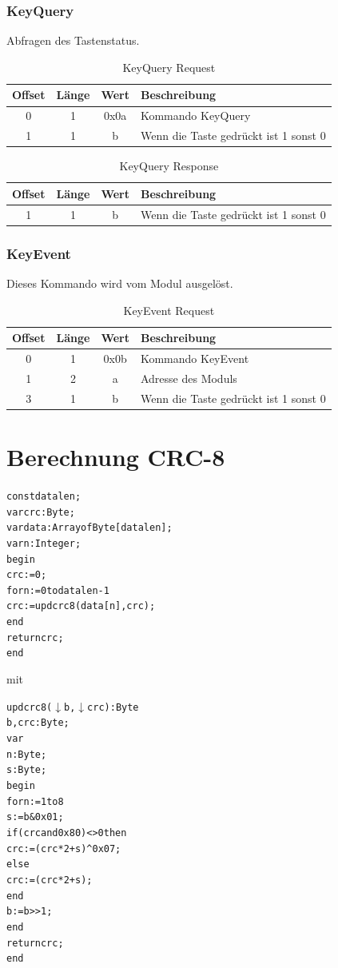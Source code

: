 \documentclass[10pt,a4paper]{article}
\begin{document}
\subsubsection{KeyQuery}
\label{sec:KeyQuery}
Abfragen des Tastenstatus.
\begin{table}[H]
\centering
\begin{tabular}{c|c|c|l}
\textbf{Offset} & \textbf{Länge} & \textbf{Wert} & \textbf{Beschreibung} \\ \hline
0 & 1 & 0x0a & Kommando KeyQuery\\
1 & 1 & b & Wenn die Taste gedrückt ist 1 sonst 0
\end{tabular}
\caption{KeyQuery Request}
\end{table}
\begin{table}[H]
\label{tab:keyquery_response}
\centering
\begin{tabular}{c|c|c|l}
\textbf{Offset} & \textbf{Länge} & \textbf{Wert} & \textbf{Beschreibung} \\ \hline
1 & 1 & b & Wenn die Taste gedrückt ist 1 sonst 0
\end{tabular}
\caption{KeyQuery Response}
\end{table}

\subsubsection{KeyEvent}
\label{sec:KeyEvent}
Dieses Kommando wird vom Modul ausgelöst.
\begin{table}[H]
\centering
\begin{tabular}{c|c|c|l}
\textbf{Offset} & \textbf{Länge} & \textbf{Wert} & \textbf{Beschreibung} \\ \hline
0 & 1 & 0x0b & Kommando KeyEvent\\
1 & 2 & a & Adresse des Moduls\\
3 & 1 & b & Wenn die Taste gedrückt ist 1 sonst 0
\end{tabular}
\caption{KeyEvent Request}
\end{table}



\newpage
\appendix
\section{Berechnung CRC-8}
\label{CRC8}
\begin{alltt}
const datalen;
var crc: Byte;
var data: Array of Byte[datalen];
var n: Integer;
begin
  crc:= 0;
  for n:=0 to datalen-1
    crc := updcrc8(data[n],crc); 
  end
  return crc;
end
\end{alltt}
mit
\begin{alltt}
updcrc8(\(\downarrow\) b,\(\downarrow\) crc): Byte
  b, crc : Byte;
var
  n : Byte;
  s : Byte;
begin
  for n:=1 to 8
    s := b & 0x01;
    if (crc and 0x80)<> 0 then
      crc := (crc * 2 + s) ^ 0x07;
    else
      crc := (crc * 2 + s);
    end
    b := b >> 1;
  end
  return crc;
end
\end{alltt}
\end{document}

